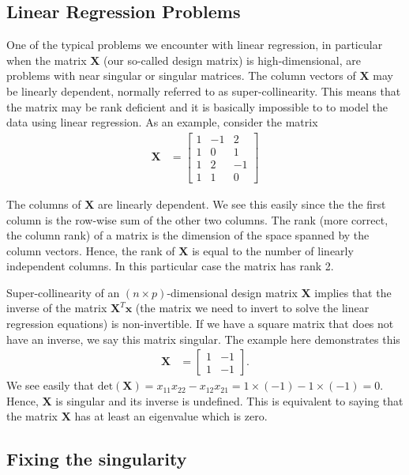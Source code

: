 \documentclass[%
oneside,                 %
final,                   %
10pt]{article}
\begin{document}
\subsection*{Linear Regression Problems}

One of the typical problems we encounter with linear regression, in particular 
when the matrix $\bm{X}$ (our so-called design matrix) is high-dimensional, 
are problems with near singular or singular matrices. The column vectors of $\bm{X}$ 
may be linearly dependent, normally referred to as super-collinearity.  
This means that the matrix may be rank deficient and it is basically impossible to 
to model the data using linear regression. As an example, consider the matrix
\begin{align*}
\mathbf{X} & =  \left[
\begin{array}{rrr}
1 & -1 & 2
\\
1 & 0 & 1
\\
1 & 2  & -1
\\
1 & 1  & 0
\end{array} \right]
\end{align*}

The columns of $\bm{X}$ are linearly dependent. We see this easily since the 
the first column is the row-wise sum of the other two columns. The rank (more correct,
the column rank) of a matrix is the dimension of the space spanned by the
column vectors. Hence, the rank of $\mathbf{X}$ is equal to the number
of linearly independent columns. In this particular case the matrix has rank 2.

Super-collinearity of an $(n \times p)$-dimensional design matrix $\mathbf{X}$ implies
that the inverse of the matrix $\bm{X}^T\bm{x}$ (the matrix we need to invert to solve the linear regression equations) is non-invertible. If we have a square matrix that does not have an inverse, we say this matrix singular. The example here demonstrates this
\begin{align*}
\bm{X} & =  \left[
\begin{array}{rr}
1 & -1
\\
1 & -1
\end{array} \right].
\end{align*}
We see easily that  $\mbox{det}(\bm{X}) = x_{11} x_{22} - x_{12} x_{21} = 1 \times (-1) - 1 \times (-1) = 0$. Hence, $\mathbf{X}$ is singular and its inverse is undefined.
This is equivalent to saying that the matrix $\bm{X}$ has at least an eigenvalue which is zero.


\subsection*{Fixing the singularity}
\end{document}
